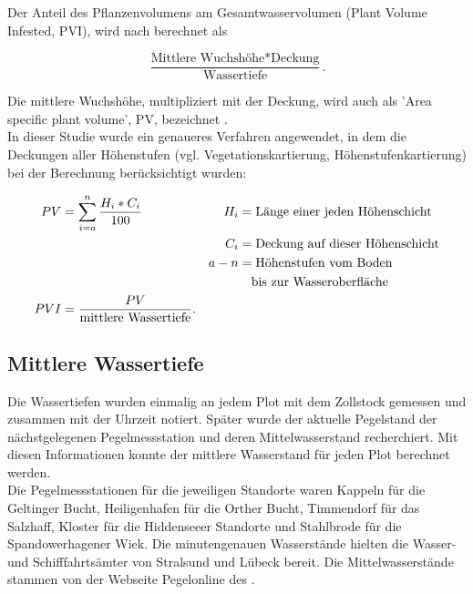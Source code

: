 Der Anteil des Pflanzenvolumens am Gesamtwasservolumen (Plant Volume Infested, PVI), wird nach \cite{jeppesen_1998, schriver_1995, canfield_1984} berechnet als 

\begin{equation*}
\frac{\text{Mittlere Wuchshöhe} * \text{Deckung}}{\text{Wassertiefe}}.
\end{equation*}

Die mittlere Wuchshöhe, multipliziert mit der Deckung, wird auch als 'Area specific plant volume', PV, bezeichnet \citep{jeppesen_1998}.\\
In dieser Studie wurde ein genaueres Verfahren angewendet, in dem die Deckungen aller Höhenstufen (vgl. Vegetationskartierung, Höhenstufenkartierung) bei der Berechnung berücksichtigt wurden:


\begin{align*}
 PV &=\sum_{i=a}^n \frac{H_i * C_i}{100} & H_i &=\text{Länge einer jeden Höhenschicht}\\ 
 & & C_i &=\text{Deckung auf dieser Höhenschicht}\\
 & & a-n &=\text{Höhenstufen vom Boden}\\
 & &     &\text{\quad bis zur Wasseroberfläche}\\
 PVI &=\frac{PV}{\text{mittlere Wassertiefe}}.\\
\end{align*}



\subsection {Mittlere Wassertiefe}

Die Wassertiefen wurden einmalig an jedem Plot mit dem Zollstock gemessen und zusammen mit der Uhrzeit notiert. Später wurde der aktuelle Pegelstand der nächstgelegenen Pegelmessstation und deren Mittelwasserstand recherchiert. Mit diesen Informationen konnte der mittlere Wasserstand für jeden Plot berechnet werden.\\
Die Pegelmessstationen für die jeweiligen Standorte waren Kappeln für die Geltinger Bucht, Heiligenhafen für die Orther Bucht, Timmendorf für das Salzhaff, Kloster für die Hiddenseeer Standorte und Stahlbrode für die Spandowerhagener Wiek. Die minutengenauen Wasserstände hielten die Wasser- und Schifffahrtsämter von Stralsund und Lübeck bereit. Die Mittelwasserstände stammen von der Webseite Pegelonline des \cite{wasser-_und_schifffahrtsverwaltung_des_bundes_2013}.



